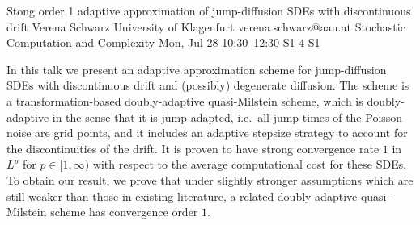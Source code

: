 \begin{talk}
  {Stong order 1 adaptive approximation of jump-diffusion SDEs with discontinuous drift}%
  {Verena Schwarz}%
  {University of Klagenfurt}%
  {verena.schwarz@aau.at}%
  {Stochastic Computation and Complexity}%
  {}%
  {Mon, Jul 28 10:30–12:30}%
  {S1-4}%
  {S1}%
				

In this talk we present an adaptive approximation scheme for jump-diffusion SDEs with discontinuous drift and (possibly) degenerate diffusion. The scheme is a transformation-based doubly-adaptive quasi-Milstein scheme, which 
is doubly-adaptive in the sense that it is jump-adapted, i.e.~all jump times of the Poisson noise are grid points, and it includes an adaptive stepsize strategy to account for the discontinuities of the drift. It is proven to have strong convergence rate $1$ in $L^p$ for $p\in[1,\infty)$ with respect to the average computational cost for these SDEs. 
To obtain our result, we prove that under slightly stronger assumptions which are still weaker than those in existing literature, a related doubly-adaptive quasi-Milstein scheme has convergence order $1$. 
\end{talk}

